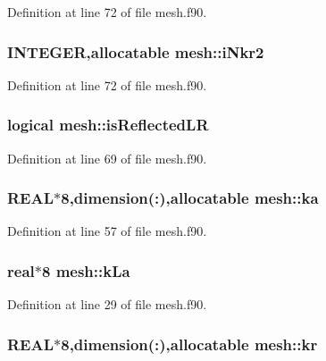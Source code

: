 Definition at line 72 of file mesh.f90.

\hypertarget{namespacemesh_a4a147979d603b0d2f61b08be8bd3e40e}{
\subsubsection[{iNkr2}]{\setlength{\rightskip}{0pt plus 5cm}INTEGER,allocatable {\bf mesh::iNkr2}}}
\label{namespacemesh_a4a147979d603b0d2f61b08be8bd3e40e}


Definition at line 72 of file mesh.f90.

\hypertarget{namespacemesh_ac40d4b15a769844035c498c2ed396e4c}{
\subsubsection[{isReflectedLR}]{\setlength{\rightskip}{0pt plus 5cm}logical {\bf mesh::isReflectedLR}}}
\label{namespacemesh_ac40d4b15a769844035c498c2ed396e4c}


Definition at line 69 of file mesh.f90.

\hypertarget{namespacemesh_acdc9121ee94e3c62c59255106d13fddd}{
\subsubsection[{ka}]{\setlength{\rightskip}{0pt plus 5cm}REAL$\ast$8,dimension(:),allocatable {\bf mesh::ka}}}
\label{namespacemesh_acdc9121ee94e3c62c59255106d13fddd}


Definition at line 57 of file mesh.f90.

\hypertarget{namespacemesh_a9b60e77e26ab439594233774c928b35c}{
\subsubsection[{kLa}]{\setlength{\rightskip}{0pt plus 5cm}real$\ast$8 {\bf mesh::kLa}}}
\label{namespacemesh_a9b60e77e26ab439594233774c928b35c}


Definition at line 29 of file mesh.f90.

\hypertarget{namespacemesh_a0eb10f03f0d716aafcb803855dff1b80}{
\subsubsection[{kr}]{\setlength{\rightskip}{0pt plus 5cm}REAL$\ast$8,dimension(:),allocatable {\bf mesh::kr}}}
\label{namespacemesh_a0eb10f03f0d716aafcb803855dff1b80}


